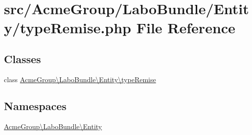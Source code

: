 \hypertarget{type_remise_8php}{\section{src/\+Acme\+Group/\+Labo\+Bundle/\+Entity/type\+Remise.php File Reference}
\label{type_remise_8php}
}
\subsection*{Classes}
\begin{DoxyCompactItemize}
\item 
class \hyperlink{class_acme_group_1_1_labo_bundle_1_1_entity_1_1type_remise}{Acme\+Group\textbackslash{}\+Labo\+Bundle\textbackslash{}\+Entity\textbackslash{}type\+Remise}
\end{DoxyCompactItemize}
\subsection*{Namespaces}
\begin{DoxyCompactItemize}
\item 
 \hyperlink{namespace_acme_group_1_1_labo_bundle_1_1_entity}{Acme\+Group\textbackslash{}\+Labo\+Bundle\textbackslash{}\+Entity}
\end{DoxyCompactItemize}
